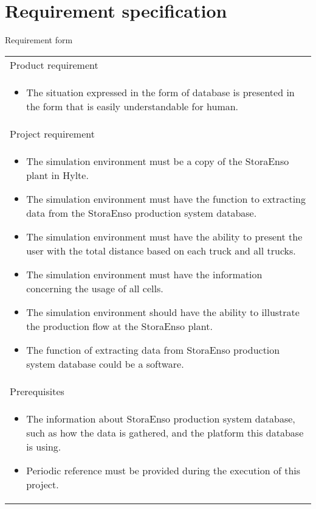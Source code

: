 \documentclass{report}
\begin{document}
\section{Requirement specification}
Requirement form \\
\begin{table}[h]
\begin{tabular}{| p{12cm} |}
	\hline
	Product requirement \\
	\begin{itemize}
	\item
	The situation expressed in the form of database is presented in the form that is easily understandable for human.
	\end{itemize}
	\\

	\hline
	Project requirement \\
	\begin{itemize}
	\item
	The simulation environment must be a copy of the StoraEnso plant in Hylte.
	\item
	The simulation environment must have the function to extracting data from the StoraEnso production system database.
	\item
	The simulation environment must have the ability to present the user with the total distance based on each truck and all trucks.
	\item
	The simulation environment must have the information concerning the usage of all cells.
	\item
	The simulation environment should have the ability to illustrate the production flow at the StoraEnso plant.
	\item
	The function of extracting data from StoraEnso production system database could be a software.
	\end{itemize}
	\\
	\hline
	Prerequisites \\
	\begin{itemize}
	\item
	The information about StoraEnso production system database, such as how the data is gathered, and the platform this database is using.
	\item
	Periodic reference must be provided during the execution of this project.
	\end{itemize}
	\\
	\hline
\end{tabular}
\end{table}
\end{document}
